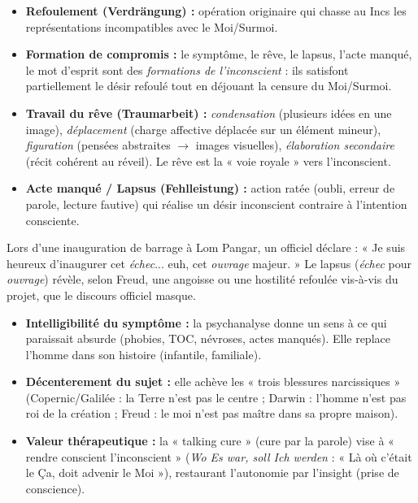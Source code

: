 \documentclass[11pt]{article}
\newcounter{popsec}
\newcounter{popsub}
\newcommand{\courssub}[1]{%
  \stepcounter{popsub}%
  \par\vspace{9pt}\noindent{\popxbold\fontsize{11.5}{13}\selectfont\color{popink}{\color{poporange}\thepopsec.\thepopsub}\hspace{6pt}#1}\par\nopagebreak\vspace{4pt}
}
\begin{document}
\begin{propriete}
\begin{itemize}
\item \textbf{Refoulement (Verdrängung) :} opération originaire qui chasse au Incs les représentations incompatibles avec le Moi/Surmoi.
\item \textbf{Formation de compromis :} le symptôme, le rêve, le lapsus, l'acte manqué, le mot d'esprit sont des \emph{formations de l'inconscient} : ils satisfont partiellement le désir refoulé tout en déjouant la censure du Moi/Surmoi.
\item \textbf{Travail du rêve (Traumarbeit) :} \emph{condensation} (plusieurs idées en une image), \emph{déplacement} (charge affective déplacée sur un élément mineur), \emph{figuration} (pensées abstraites $\rightarrow$ images visuelles), \emph{élaboration secondaire} (récit cohérent au réveil). Le rêve est la « voie royale » vers l'inconscient.
\item \textbf{Acte manqué / Lapsus (Fehlleistung) :} action ratée (oubli, erreur de parole, lecture fautive) qui réalise un désir inconscient contraire à l'intention consciente.
\end{itemize}
\end{propriete}

\begin{exemplebox}
Lors d'une inauguration de barrage à Lom Pangar, un officiel déclare : « Je suis heureux d'inaugurer cet \emph{échec}... euh, cet \emph{ouvrage} majeur. » Le lapsus (\emph{échec} pour \emph{ouvrage}) révèle, selon Freud, une angoisse ou une hostilité refoulée vis-à-vis du projet, que le discours officiel masque.
\end{exemplebox}

\courssub{Valeur et limites de la psychanalyse}

\begin{propriete}
\begin{itemize}
\item \textbf{Intelligibilité du symptôme :} la psychanalyse donne un sens à ce qui paraissait absurde (phobies, TOC, névroses, actes manqués). Elle replace l'homme dans son histoire (infantile, familiale).
\item \textbf{Décenterement du sujet :} elle achève les « trois blessures narcissiques » (Copernic/Galilée : la Terre n'est pas le centre ; Darwin : l'homme n'est pas roi de la création ; Freud : le moi n'est pas maître dans sa propre maison).
\item \textbf{Valeur thérapeutique :} la « talking cure » (cure par la parole) vise à « rendre conscient l'inconscient » (\emph{Wo Es war, soll Ich werden} : « Là où c'était le Ça, doit advenir le Moi »), restaurant l'autonomie par l'insight (prise de conscience).
\end{itemize}
\end{propriete}
\end{document}
